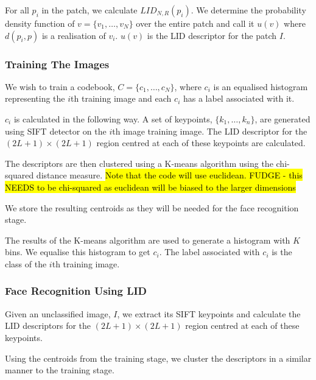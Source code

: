 \documentclass{article}
\begin{document}
For all $p_i$ in the patch, we calculate $ LID_{N,R}(p_i)$.
We determine the probability density function of $v=\{v_1,\ldots,v_N\}$ over the entire patch and call it $u(v)$ where $d(p_i,p)$ is a realisation of $v_i$. $u(v)$ is the LID descriptor for the patch $I$.

\subsubsection{Training The Images}
We wish to train a codebook, $C=\{c_1, \ldots, c_N\}$, where $c_i$ is an equalised histogram representing the $i$th training image and each $c_i$ has a label associated with it.

$c_i$ is calculated in the following way. A set of keypoints, $\{k_1, \ldots, k_n\}$, are generated using SIFT detector on the $i$th image training image. The LID descriptor for the $(2L+1)\times(2L+1)$ region centred at each of these keypoints are calculated.

The descriptors are then clustered using a K-means algorithm using the chi-squared distance measure. \hl{Note that the code will use euclidean. FUDGE - this NEEDS to be chi-squared as euclidean will be biased to the larger dimensions}

We store the resulting centroids as they will be needed for the face recognition stage.

The results of the K-means algorithm are used to generate a histogram with $K$ bins. We equalise this histogram to get $c_i$. The label associated with $c_i$ is the class of the $i$th training image.

\subsubsection{Face Recognition Using LID}
Given an unclassified image, $I$, we extract its SIFT keypoints and calculate the LID descriptors for the $(2L+1)\times(2L+1)$ region centred at each of these keypoints.

Using the centroids from the training stage, we cluster the descriptors in a similar manner to the training stage.
\end{document}
